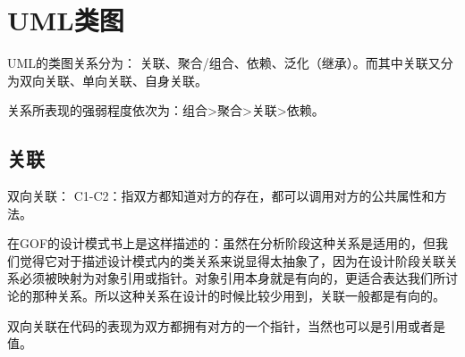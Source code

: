 
\section{UML类图}
UML的类图关系分为： 关联、聚合/组合、依赖、泛化（继承）。而其中关联又分为双向关联、单向关联、自身关联。

关系所表现的强弱程度依次为：组合>聚合>关联>依赖。

\subsection{关联}


双向关联：
C1-C2：指双方都知道对方的存在，都可以调用对方的公共属性和方法。

在GOF的设计模式书上是这样描述的：虽然在分析阶段这种关系是适用的，但我们觉得它对于描述设计模式内的类关系来说显得太抽象了，因为在设计阶段关联关系必须被映射为对象引用或指针。对象引用本身就是有向的，更适合表达我们所讨论的那种关系。所以这种关系在设计的时候比较少用到，关联一般都是有向的。

双向关联在代码的表现为双方都拥有对方的一个指针，当然也可以是引用或者是值。







